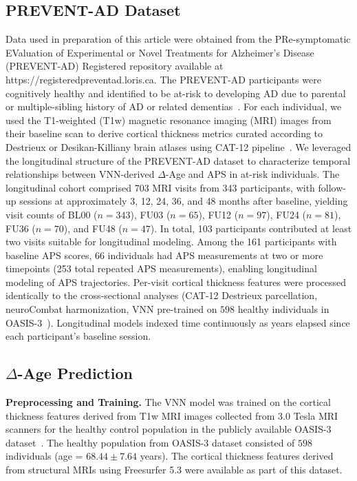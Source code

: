 \documentclass[conference]{IEEEtran}
\begin{document}
\subsection{PREVENT-AD Dataset}
Data used in preparation of this article were obtained from the PRe-symptomatic EValuation of Experimental or Novel Treatments for Alzheimer's Disease (PREVENT-AD) Registered repository available at https://registeredpreventad.loris.ca. The PREVENT-AD participants were cognitively healthy and identified to be at-risk to developing AD due to parental or multiple-sibling history of AD or related dementias~\cite{cannon2019relative,tremblay2021open}. For each individual, we used the T1-weighted (T1w) magnetic resonance imaging (MRI) images from their baseline scan to derive cortical thickness metrics curated according to Destrieux or Desikan-Killiany brain atlases using CAT-12 pipeline~\cite{gaser2022cat}. We leveraged the longitudinal structure of the PREVENT-AD dataset to characterize temporal relationships between VNN-derived $\Delta$-Age and APS in at-risk individuals. The longitudinal cohort comprised 703 MRI visits from 343 participants, with follow-up sessions at approximately 3, 12, 24, 36, and 48 months after baseline, yielding visit counts of BL00 ($n=343$), FU03 ($n=65$), FU12 ($n=97$), FU24 ($n=81$), FU36 ($n=70$), and FU48 ($n=47$). In total, 103 participants contributed at least two visits suitable for longitudinal modeling. Among the 161 participants with baseline APS scores, 66 individuals had APS measurements at two or more timepoints (253 total repeated APS measurements), enabling longitudinal modeling of APS trajectories. Per-visit cortical thickness features were processed identically to the cross-sectional analyses (CAT-12 Destrieux parcellation, neuroCombat harmonization, VNN pre-trained on $598$ healthy individuals in OASIS-3~\cite{lamontagne2019oasis}). Longitudinal models indexed time continuously as years elapsed since each participant's baseline session.

\subsection{$\Delta$-Age Prediction}
\noindent
{\bf Preprocessing and Training.} The VNN model was trained on the cortical thickness features derived from T1w MRI images collected from 3.0 Tesla MRI scanners for the healthy control population in the publicly available OASIS-3 dataset~\cite{lamontagne2019oasis}. The healthy population from OASIS-3 dataset consisted of $598$ individuals (age = $68.44\pm 7.64$ years). The cortical thickness features derived from structural MRIs using Freesurfer 5.3 were available as part of this dataset.
\end{document}

